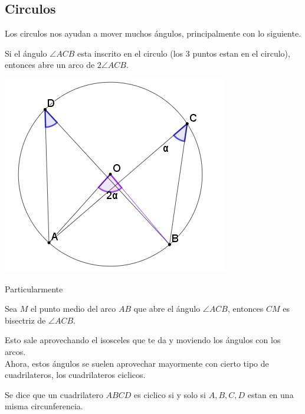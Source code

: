 \documentclass[11pt]{scrartcl}
\begin{document}
\subsection{Circulos}
Los circulos nos ayudan a mover muchos \'angulos, principalmente con lo siguiente.
\begin{theorem}
    Si el \'angulo $\angle ACB$ esta inscrito en el circulo (los 3 puntos estan en el circulo), entonces abre un arco de $2\angle ACB$.
    \begin{center}
        \includegraphics[scale=0.5]{AC3.jpg}
    \end{center}
\end{theorem}
Particularmente
\begin{theorem}
    Sea $M$ el punto medio del arco $AB$ que abre el \'angulo $\angle ACB$, entonces $CM$ es bisectriz de $\angle ACB$.
\end{theorem}
Esto sale aprovechando el isosceles que te da y moviendo los \'angulos con los arcos. \\
Ahora, estos \'angulos se suelen aprovechar mayormente con cierto tipo de cuadrilateros, los cuadrilateros ciclicos.
\begin{definition}
    Se dice que un cuadrilatero $ABCD$ es ciclico si y solo si $A,B,C,D$ estan en una misma circunferencia.
\end{definition}
\end{document}
